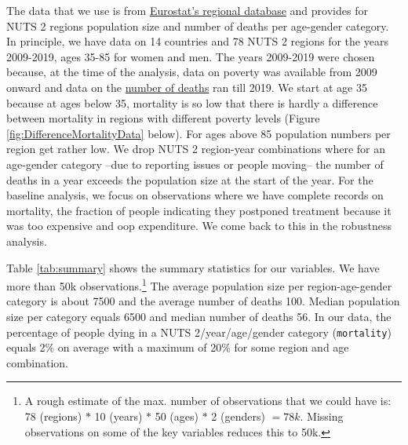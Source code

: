 \documentclass[a4paper,12pt]{article}
\begin{document}
The data that we use is from \href{https://ec.europa.eu/eurostat/web/regions/data/database}{Eurostat's regional database} and provides for NUTS 2 regions population size and number of deaths per age-gender category. In principle, we have data on 14 countries and 78 NUTS 2 regions for the years 2009-2019, ages 35-85 for women and men. The years 2009-2019 were chosen  because, at the time of the analysis, data on poverty was available from 2009 onward and data on the \href{https://ec.europa.eu/eurostat/databrowser/view/demo\_r\_magec/default/table?lang=en}{number of deaths} ran till 2019. We start at age 35 because at ages below 35, mortality is so low that there is hardly a difference between mortality in regions with different poverty levels (Figure \ref{fig:DifferenceMortalityData} below). For ages above 85 population numbers per region get rather low. We drop NUTS 2 region-year combinations where for an age-gender category --due to reporting issues or people moving-- the number of deaths in a year exceeds the population size at the start of the year. For the baseline analysis, we focus on observations where we have complete records on mortality, the fraction of people indicating they postponed treatment because it was too expensive and oop expenditure. We come back to this in the robustness analysis.

Table \ref{tab:summary} shows the summary statistics for our variables. We have more than 50k observations.\footnote{A rough estimate of the max. number of observations that we could have is: 78 (regions) \(*\) 10 (years) \(*\) 50 (ages) \(*\) 2 (genders) \(=78k\). Missing observations on some of the key variables reduces this to 50k.} The average population size per region-age-gender category is about 7500 and the average number of deaths 100. Median population size per category equals 6500 and median number of deaths 56. In our data, the percentage of people dying in a NUTS 2/year/age/gender category (\texttt{mortality}) equals 2\% on average with a maximum of 20\% for some region and age combination.
\end{document}
